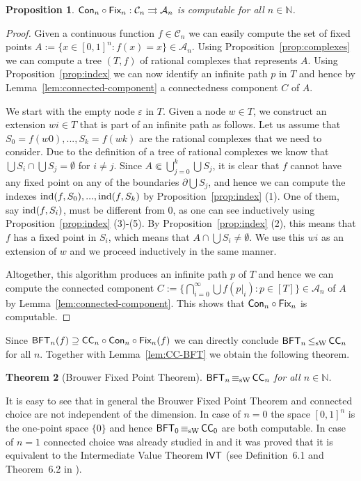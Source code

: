 \documentclass[a4paper]{amsart}
\def\AA{{\mathcal A}}
\def\CC{{\mathcal C}}
\def\IN{{\mathbb{N}}}
\def\mto{\rightrightarrows}
\def\ind{{\rm ind}}
\def\IVT{\text{\rm\sffamily IVT}}
\def\BFT{\mbox{\rm\sffamily BFT}}
\def\ConC{\mbox{\rm\sffamily CC}}
\def\Con{\text{\rm\sffamily Con}}
\def\Fix{\text{\rm\sffamily Fix}}
\def\leqSW{\mathop{\leq_{\mathrm{sW}}}}
\def\equivSW{\mathop{\equiv_{\mathrm{sW}}}}
\newtheorem{theorem}{Theorem}[section]
\newtheorem{proposition}[theorem]{Proposition}
\theoremstyle{definition}
\begin{document}
\begin{proposition}
\label{prop:Con-Fix}
$\Con_n\circ\Fix_n:\CC_n\mto\AA_n$ is computable for all $n\in\IN$.
\end{proposition}
\begin{proof}
Given a continuous function $f\in\CC_n$ we can easily compute the set of fixed points $A:=\{x\in[0,1]^n:f(x)=x\}\in\AA_n$.
Using Proposition~\ref{prop:complexes} we can compute a tree $(T,f)$ of rational complexes that represents $A$.
Using Proposition~\ref{prop:index} we can now identify an infinite path $p$ in $T$ and hence
by Lemma~\ref{lem:connected-component} a connectedness component $C$ of $A$. 

We start with the empty node $\varepsilon$ in $T$. 
Given a node $w\in T$, we construct an extension $wi\in T$ that is part of an infinite path as follows.
Let us assume that $S_0=f(w0),...,S_k=f(wk)$ are the rational complexes that we need to consider. 
Due to the definition of a tree of rational complexes we know that $\bigcup S_i\cap\bigcup S_j=\emptyset$ for $i\not=j$.
Since $A\Subset\bigcup_{j=0}^k\bigcup S_j$, it is clear that $f$ cannot have any fixed point on
any of the boundaries $\partial\bigcup S_j$, and hence we can compute the indexes $\ind(f,S_0),...,\ind(f,S_k)$ by Proposition~\ref{prop:index} (1).
One of them, say $\ind(f,S_i)$, must be different from $0$, as one can see inductively using Proposition~\ref{prop:index} (3)-(5).
By Proposition~\ref{prop:index} (2), this means that $f$ has a fixed point in $S_i$, which means
that $A\cap\bigcup S_i\not=\emptyset$. We use this $wi$ as an extension of $w$ and we proceed
inductively in the same manner.

Altogether, this algorithm produces an infinite path $p$ of $T$ and hence we can compute
the connected component $C:=\{\bigcap_{i=0}^\infty\bigcup f(p|_i):p\in[T]\}\in\AA_n$ of $A$ by Lemma~\ref{lem:connected-component}.
This shows that $\Con_n\circ\Fix_n$ is computable.
\end{proof}

Since $\BFT_n(f)\supseteq\ConC_n\circ\Con_n\circ\Fix_n(f)$ we can directly conclude $\BFT_n\leqSW\ConC_n$ for all $n$.
Together with Lemma~\ref{lem:CC-BFT} we obtain the following theorem.

\begin{theorem}[Brouwer Fixed Point Theorem]
\label{thm:BFT}
$\BFT_n\equivSW\ConC_n$ for all $n\in\IN$.
\end{theorem}

It is easy to see that in general the Brouwer Fixed Point Theorem and connected choice
are not independent of the dimension. In case of $n=0$ the space $[0,1]^n$ is the
one-point space $\{0\}$ and hence $\BFT_0\equivSW\ConC_0$ are both computable. 
In case of $n=1$ connected choice was already studied in \cite{BG11a} and it was
proved that it is equivalent to the Intermediate Value Theorem $\IVT$ (see Definition~6.1 and Theorem~6.2 in \cite{BG11a}).
\end{document}
